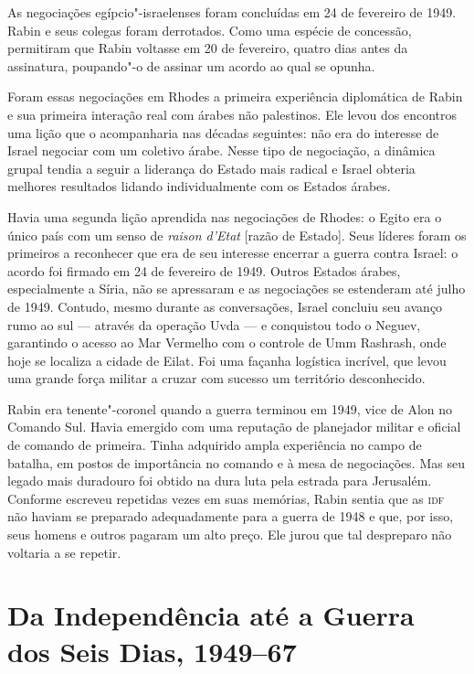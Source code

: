 As negociações egípcio"-israelenses foram concluídas em 24 de fevereiro
de 1949. Rabin e seus colegas foram derrotados. Como uma espécie de
concessão, permitiram que Rabin voltasse em 20 de fevereiro, quatro dias
antes da assinatura, poupando"-o de assinar um acordo ao qual se opunha.

Foram essas negociações em Rhodes a primeira experiência diplomática de
Rabin e sua primeira interação real com árabes não palestinos. Ele levou
dos encontros uma lição que o acompanharia nas décadas seguintes: não
era do interesse de Israel negociar com um coletivo árabe. Nesse tipo de
negociação, a dinâmica grupal tendia a seguir a liderança do Estado mais
radical e Israel obteria melhores resultados lidando individualmente com
os Estados árabes.

Havia uma segunda lição aprendida nas negociações de Rhodes: o Egito era
o único país com um senso de \emph{raison d'Etat} {[}razão de Estado{]}. Seus líderes foram os
primeiros a reconhecer que era de seu interesse encerrar a guerra contra
Israel: o acordo foi firmado em 24 de fevereiro de 1949. Outros Estados
árabes, especialmente a Síria, não se apressaram e as negociações se
estenderam até julho de 1949. Contudo, mesmo durante as conversações, Israel
concluiu seu avanço rumo ao sul --- através da operação Uvda --- e
conquistou todo o Neguev, garantindo o acesso ao Mar Vermelho com o
controle de Umm Rashrash, onde hoje se localiza a cidade de Eilat. Foi
uma façanha logística incrível, que levou uma grande força militar a
cruzar com sucesso um território desconhecido.

Rabin era tenente"-coronel quando a guerra terminou em 1949, vice de Alon
no Comando Sul. Havia emergido com uma reputação de planejador militar e
oficial de comando de primeira. Tinha adquirido ampla experiência no
campo de batalha, em postos de importância no comando e à mesa de
negociações. Mas seu legado mais duradouro foi obtido na dura
luta pela estrada para Jerusalém. Conforme escreveu repetidas vezes em
suas memórias, Rabin sentia que as \textsc{idf} não haviam se preparado
adequadamente para a guerra de 1948 e que, por isso, seus homens e
outros pagaram um alto preço. Ele jurou que tal despreparo não voltaria
a se repetir.

\chapter[Da Independência até a Guerra dos Seis Dias, 1949--67]{Da Independência até a Guerra\\ dos Seis Dias, 1949--67}

